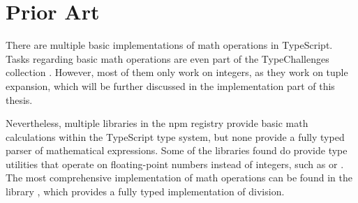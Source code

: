\section{Prior Art}

There are multiple basic implementations of math operations in TypeScript. Tasks regarding basic math operations are even part of the TypeChallenges collection \cite{TypechallengesTypechallenges2023}. However, most of them only work on integers, as they work on tuple expansion, which will be further discussed in the implementation part of this thesis.

Nevertheless, multiple libraries in the \acrshort{npm} registry provide basic math calculations within the TypeScript type system, but none provide a fully typed parser of mathematical expressions. Some of the libraries found do provide type utilities that operate on floating-point numbers instead of integers, such as  \cite{sorhusSindresorhusTypefest2023} or  \cite{kawayilinlinKawayiLinLinTypescriptlodash2023}. The most comprehensive implementation of math operations can be found in the  library \cite{arielTypeLevelArithmetic2023}, which provides a fully typed implementation of division.

